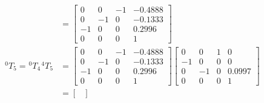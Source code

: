 \begin{equation*}
\begin{split}
                                                                  & =\begin{bmatrix}
                                                                         0  & 0  & -1 & -0.4888 \\
                                                                         0  & -1 & 0  & -0.1333 \\
                                                                         -1 & 0  & 0  & 0.2996  \\
                                                                         0  & 0  & 0  & 1
                                                                     \end{bmatrix}                                           \\
        ^{0}T_{5} = \hspace{1pt} ^{0}T_{4} \hspace{1pt} ^{4}T_{5} & =\begin{bmatrix}
                                                                         0  & 0  & -1 & -0.4888 \\
                                                                         0  & -1 & 0  & -0.1333 \\
                                                                         -1 & 0  & 0  & 0.2996  \\
                                                                         0  & 0  & 0  & 1
                                                                     \end{bmatrix}  \begin{bmatrix}
                                                                                        0  & 0  & 1 & 0      \\
                                                                                        -1 & 0  & 0 & 0      \\
                                                                                        0  & -1 & 0 & 0.0997 \\
                                                                                        0  & 0  & 0 & 1
                                                                                    \end{bmatrix}                              \\
                                                                  & =\begin{bmatrix}

\end{bmatrix}
\end{split}
\end{equation*}
